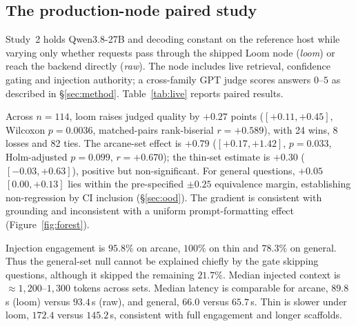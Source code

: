 \documentclass[10pt,twocolumn]{article}
\begin{document}
\subsection{The production-node paired study}\label{sec:live}
Study~2 holds Qwen3.8-27B and decoding constant on the reference host while varying only whether requests pass through the shipped Loom node (\emph{loom}) or reach the backend directly (\emph{raw}). The node includes live retrieval, confidence gating and injection authority; a cross-family GPT judge scores answers $0$--$5$ as described in \S\ref{sec:method}. Table~\ref{tab:live} reports paired results.

Across $n=114$, loom raises judged quality by $\mathbf{+0.27}$ points ($[+0.11,+0.45]$, Wilcoxon $p=0.0036$, matched-pairs rank-biserial $r=+0.589$), with 24 wins, 8 losses and 82 ties. The arcane-set effect is $\mathbf{+0.79}$ ($[+0.17,+1.42]$, $p=0.033$, Holm-adjusted $p=0.099$, $r=+0.670$); the thin-set estimate is $+0.30$ ($[-0.03,+0.63]$), positive but non-significant. For general questions, $+0.05$ $[0.00,+0.13]$ lies within the pre-specified $\pm0.25$ equivalence margin, establishing non-regression by CI inclusion (\S\ref{sec:ood}). The gradient is consistent with grounding and inconsistent with a uniform prompt-formatting effect (Figure~\ref{fig:forest}).



Injection engagement is $95.8\%$ on arcane, $100\%$ on thin and $78.3\%$ on general. Thus the general-set null cannot be explained chiefly by the gate skipping questions, although it skipped the remaining $21.7\%$. Median injected context is $\approx1{,}200$--$1{,}300$ tokens across sets. Median latency is comparable for arcane, $89.8$\,s (loom) versus $93.4$\,s (raw), and general, $66.0$ versus $65.7$\,s. Thin is slower under loom, $172.4$ versus $145.2$\,s, consistent with full engagement and longer scaffolds.
\end{document}
